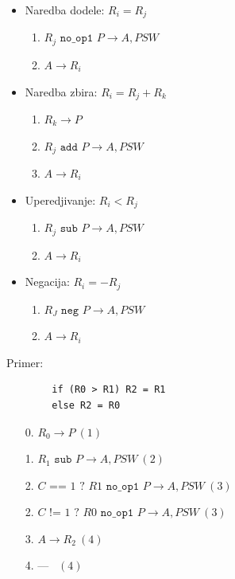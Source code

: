 \documentclass[12p,a4paper]{article}
\begin{document}
\begin{multicols}{2}
    \begin{itemize}
        \itemsep0em
        \item Naredba dodele: $R_i = R_j$
            \begin{enumerate}
                \itemsep0em
                \item $R_j \texttt{ no\_op1 } P \rightarrow A, PSW$
                \item $A \rightarrow R_i$
            \end{enumerate}
        \item Naredba zbira: $R_i = R_j + R_k$
            \begin{enumerate}
                \itemsep0em
                \item $R_k \rightarrow P$
                \item $R_j \texttt{ add } P \rightarrow A, PSW$
                \item $A \rightarrow R_i$
            \end{enumerate}
        \item Uperedjivanje: $R_i < R_j$
            \begin{enumerate}
                \itemsep0em
                \item $R_j \texttt{ sub } P \rightarrow A, PSW$
                \item $A \rightarrow R_i$
            \end{enumerate}
        \item Negacija: $R_i = -R_j$
            \begin{enumerate}
                \itemsep0em
                \item $R_J \texttt{ neg } P \rightarrow A, PSW$
                \item $A \rightarrow R_i$
            \end{enumerate}
    \end{itemize}

    Primer:
    \begin{lstlisting}
        if (R0 > R1) R2 = R1
        else R2 = R0
    \end{lstlisting}

    \begin{enumerate}
        \itemsep0em
        \item [0.] $R_0 \rightarrow P \ (1)$
        \item [1.] $R_1 \texttt{ sub } P \rightarrow A, PSW \ (2)$
        \item [2.] $C \texttt{ == } 1 \texttt{ ? } R1 \texttt{ no\_op1 } 
            P \rightarrow A, PSW \ (3)$
        \item [2.] $C \texttt{ != } 1 \texttt{ ? } R0 \texttt{ no\_op1 } 
            P \rightarrow A, PSW \ (3)$
        \item [3.] $A \rightarrow R_2 \ (4)$
        \item [4.] --- \ $(4)$
    \end{enumerate}

\end{multicols}
\end{document}
